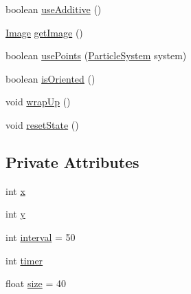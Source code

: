 \begin{DoxyCompactItemize}
\item 
boolean \mbox{\hyperlink{classorg_1_1newdawn_1_1slick_1_1particles_1_1effects_1_1_fire_emitter_afbace8ff2bcdb80e3ec810ffcdeaf521}{use\+Additive}} ()
\item 
\mbox{\hyperlink{classorg_1_1newdawn_1_1slick_1_1_image}{Image}} \mbox{\hyperlink{classorg_1_1newdawn_1_1slick_1_1particles_1_1effects_1_1_fire_emitter_afa45cb540a0c320d45c530d499d6eae3}{get\+Image}} ()
\item 
boolean \mbox{\hyperlink{classorg_1_1newdawn_1_1slick_1_1particles_1_1effects_1_1_fire_emitter_ab1eb7609b370a6a8cffbb5b7e1bd6cb3}{use\+Points}} (\mbox{\hyperlink{classorg_1_1newdawn_1_1slick_1_1particles_1_1_particle_system}{Particle\+System}} system)
\item 
boolean \mbox{\hyperlink{classorg_1_1newdawn_1_1slick_1_1particles_1_1effects_1_1_fire_emitter_a192b97279748b97f24fce7e04b9fc90b}{is\+Oriented}} ()
\item 
void \mbox{\hyperlink{classorg_1_1newdawn_1_1slick_1_1particles_1_1effects_1_1_fire_emitter_a8e888bb6d290b9df6883d0ebb35f1067}{wrap\+Up}} ()
\item 
void \mbox{\hyperlink{classorg_1_1newdawn_1_1slick_1_1particles_1_1effects_1_1_fire_emitter_a8caebb6bf21a766da28469533db95b37}{reset\+State}} ()
\end{DoxyCompactItemize}
\subsection*{Private Attributes}
\begin{DoxyCompactItemize}
\item 
int \mbox{\hyperlink{classorg_1_1newdawn_1_1slick_1_1particles_1_1effects_1_1_fire_emitter_a0a4e74935fd83b2cc185add63d715c50}{x}}
\item 
int \mbox{\hyperlink{classorg_1_1newdawn_1_1slick_1_1particles_1_1effects_1_1_fire_emitter_afa9422fae980440d2ff94c2e115dde3c}{y}}
\item 
int \mbox{\hyperlink{classorg_1_1newdawn_1_1slick_1_1particles_1_1effects_1_1_fire_emitter_a007bd6dc16865e8d71b373bbd29acd1f}{interval}} = 50
\item 
int \mbox{\hyperlink{classorg_1_1newdawn_1_1slick_1_1particles_1_1effects_1_1_fire_emitter_a60cf4c23819ed185668f9bc059f678f3}{timer}}
\item 
float \mbox{\hyperlink{classorg_1_1newdawn_1_1slick_1_1particles_1_1effects_1_1_fire_emitter_a56f377cd2920bfb430498077465db884}{size}} = 40
\end{DoxyCompactItemize}


